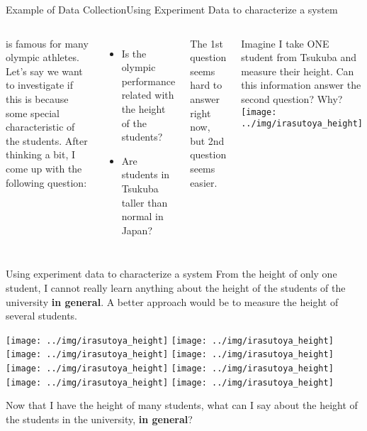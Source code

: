 \begin{frame}{Example of Data Collection}{Using Experiment Data to characterize a system}
  \begin{columns}
     is famous for many olympic athletes. Let's say we want to investigate if this is because some special characteristic of the students. After thinking a bit, I come up with the following question:
    \begin{itemize}
      \item Is the olympic performance related with the height of the students?
      \item Are students in Tsukuba taller than normal in Japan?
    \end{itemize}\bigskip

    The 1st question seems hard to answer right now, but 2nd question seems easier.\bigskip

    Imagine I take ONE student from Tsukuba and measure their height.
    Can this information answer the second question? Why?
    \texttt{[image: ../img/irasutoya\_height]}
  \end{columns}
\end{frame}

\begin{frame}{Using experiment data to characterize a system}
  From the height of only one student, I cannot really learn anything about
  the height of the students of the university {\bf in general}.
  A better approach would be to measure the height of several students.\bigskip

  \begin{center}
    \texttt{[image: ../img/irasutoya\_height]}
    \texttt{[image: ../img/irasutoya\_height]}
    \texttt{[image: ../img/irasutoya\_height]}
    \texttt{[image: ../img/irasutoya\_height]}
    \texttt{[image: ../img/irasutoya\_height]}
    \texttt{[image: ../img/irasutoya\_height]}
    \texttt{[image: ../img/irasutoya\_height]}
    \texttt{[image: ../img/irasutoya\_height]}
  \end{center}
  \bigskip

  Now that I have the height of many students, what can I say about the height
  of the students in the university, {\bf in general}?
\end{frame}

